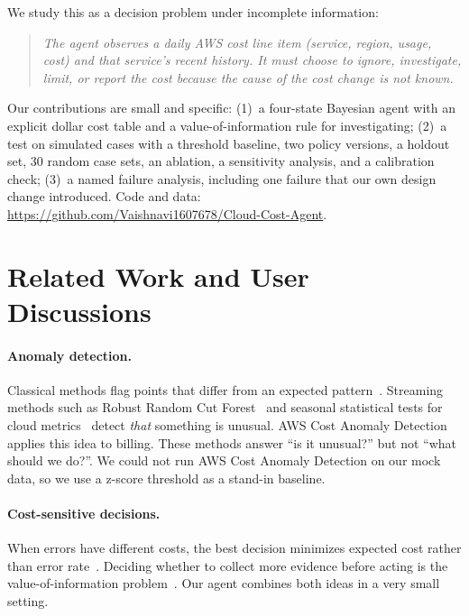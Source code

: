 \documentclass{article}
\begin{document}
We study this as a decision problem under incomplete information:

\begin{quote}
\emph{The agent observes a daily AWS cost line item (service, region, usage, cost) and that service's recent history. It must choose to ignore, investigate, limit, or report the cost because the cause of the cost change is not known.}
\end{quote}

Our contributions are small and specific:
(1)~a four-state Bayesian agent with an explicit dollar cost table and a value-of-information rule for investigating;
(2)~a test on simulated cases with a threshold baseline, two policy versions, a holdout set, 30 random case sets, an ablation, a sensitivity analysis, and a calibration check;
(3)~a named failure analysis, including one failure that our own design change introduced.
Code and data:\\ \url{https://github.com/Vaishnavi1607678/Cloud-Cost-Agent}.

\section{Related Work and User Discussions}

\paragraph{Anomaly detection.} Classical methods flag points that differ from an expected pattern~\cite{chandola2009anomaly}. Streaming methods such as Robust Random Cut Forest~\cite{guha2016rrcf} and seasonal statistical tests for cloud metrics~\cite{hochenbaum2017automatic} detect \emph{that} something is unusual. AWS Cost Anomaly Detection~\cite{aws2026anomaly} applies this idea to billing. These methods answer ``is it unusual?'' but not ``what should we do?''. We could not run AWS Cost Anomaly Detection on our mock data, so we use a z-score threshold as a stand-in baseline.

\paragraph{Cost-sensitive decisions.} When errors have different costs, the best decision minimizes expected cost rather than error rate~\cite{elkan2001foundations}. Deciding whether to collect more evidence before acting is the value-of-information problem~\cite{howard1966information}. Our agent combines both ideas in a very small setting.
\end{document}

